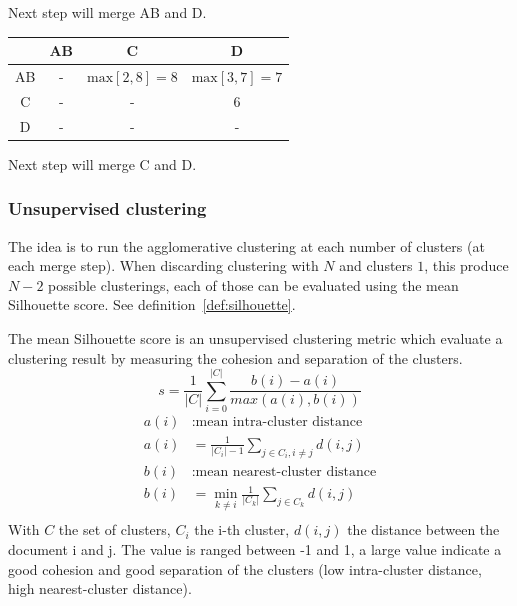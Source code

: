 \begin{example}
  \vspace{0.2cm}
  Next step will merge AB and D.

  \vspace{0.5cm}

  \begin{subexample}{\linewidth}
    \centering
    \begin{tabular}{c|c c c}
      \toprule
        & AB & C & D \\
      \midrule
      AB & - & $\text{max} \left[2, 8 \right] = 8$ & $\text{max} \left[3, 7 \right] = 7$ \\
      C  & - & - & 6 \\
      D  & - & - & - \\
      \bottomrule
    \end{tabular}
  \end{subexample}

  \vspace{0.2cm}
  Next step will merge C and D.
\end{example}

\subsubsection{Unsupervised clustering \label{sec:unsupervised_clustering}}

The idea is to run the agglomerative clustering at each number of clusters (at each merge step).
When discarding clustering with $N$ and clusters $1$, this produce $N - 2$ possible clusterings, each of those can be evaluated using the mean Silhouette score.
See definition~\ref{def:silhouette}.

\begin{definition}
  \label{def:silhouette}
  The mean Silhouette score is an unsupervised clustering metric which evaluate a clustering result by measuring the cohesion and separation of the clusters.
  \begin{equation}
    s = \frac{1}{|C|} \sum_{i = 0}^{|C|} \frac{b(i) - a(i)}{max(a(i), b(i))}
  \end{equation}
  \begin{equation*}
    \begin{split}
      a(i)&: \text{mean intra-cluster distance} \\
      a(i)& = \frac{1}{|C_i| - 1} \sum_{j \in C_i, i\neq j} d(i, j) \\
      b(i)&: \text{mean nearest-cluster distance} \\
      b(i)& = \min_{k\neq i} \frac{1}{|C_k|} \sum_{j \in C_k} d(i, j) \\
    \end{split}
  \end{equation*}
  With $C$ the set of clusters, $C_i$ the i-th cluster, $d(i, j)$ the distance between the document i and j.
  The value is ranged between -1 and 1, a large value indicate a good cohesion and good separation of the clusters (low intra-cluster distance, high nearest-cluster distance).
\end{definition}

